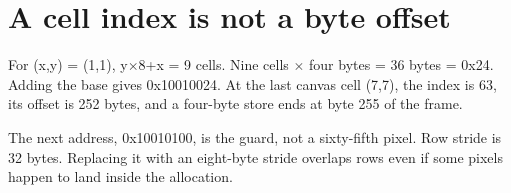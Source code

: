\section{A cell index is not a byte
  offset}\label{007-bresenham-line-x-address-a-cell-index-is-not-a-byte-offset}

For (x,y) = (1,1), y\ensuremath{\times}8+x = 9 cells. Nine cells \ensuremath{\times} four bytes = 36 bytes =
0x24. Adding the base gives 0x10010024. At the last canvas cell (7,7),
the index is 63, its offset is 252 bytes, and a four-byte store ends at
byte 255 of the frame.

The next address, 0x10010100, is the guard, not a sixty-fifth pixel. Row
stride is 32 bytes. Replacing it with an eight-byte stride overlaps rows
even if some pixels happen to land inside the allocation.

